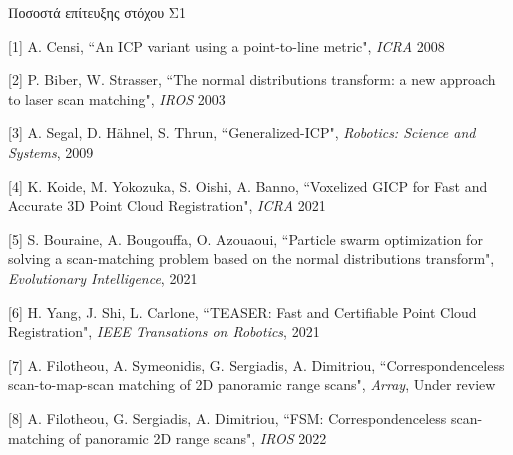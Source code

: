 \begin{frame}{Ποσοστά επίτευξης στόχου Σ1}

  \vspace{0.5cm}
  \begin{figure}\centering
    
  \end{figure}

  \vspace{-1cm}

  \placebottom
  \tiny
  [1] A. Censi, ``An ICP variant using a point-to-line metric", \textit{ICRA} 2008

  [2] P. Biber, W. Strasser, ``The normal distributions transform: a new approach to laser scan matching", \textit{IROS} 2003

  [3] A. Segal, D. Hähnel, S. Thrun, ``Generalized-ICP", \textit{Robotics: Science and Systems}, 2009

  [4] K. Koide, M. Yokozuka, S. Oishi, A. Banno, ``Voxelized GICP for Fast and Accurate 3D Point Cloud Registration", \textit{ICRA} 2021

  [5] S. Bouraine, A. Bougouffa, O. Azouaoui, ``Particle swarm optimization for solving a scan-matching problem based on the normal distributions transform", \textit{Evolutionary Intelligence}, 2021

  [6] H. Yang, J. Shi, L. Carlone, ``TEASER: Fast and Certifiable Point Cloud Registration", \textit{IEEE Transations on Robotics}, 2021

  [7] A. Filotheou, A. Symeonidis, G. Sergiadis, A. Dimitriou, ``Correspondenceless scan-to-map-scan matching of 2D panoramic range scans", \textit{Array}, Under review

  [8] A. Filotheou, G. Sergiadis,  A. Dimitriou, ``FSM: Correspondenceless scan-matching of panoramic 2D range scans", \textit{IROS} 2022

\end{frame}
